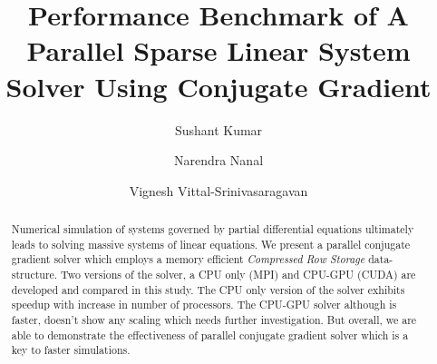 \documentclass[sigplan,screen]{acmart}
\begin{document}
\title{Performance Benchmark of A Parallel Sparse Linear System Solver Using Conjugate Gradient}

\author{Sushant Kumar}
\authornotemark[1]

\author{Narendra Nanal}
\authornotemark[2]

\author{Vignesh Vittal-Srinivasaragavan}
\authornotemark[3]


\begin{abstract}
  Numerical simulation of systems governed by partial differential equations ultimately leads to solving massive systems of linear equations. We present a parallel conjugate gradient solver which employs a memory efficient \emph{Compressed Row Storage} data-structure. Two versions of the solver, a CPU only (MPI) and CPU-GPU (CUDA) are developed and compared in this study. The CPU only version of the solver exhibits speedup with increase in number of processors. The CPU-GPU solver although is faster, doesn't show any scaling which needs further investigation. But overall, we are able to demonstrate the effectiveness of parallel conjugate gradient solver which is a key to faster simulations.
\end{abstract}

%


\end{document}
